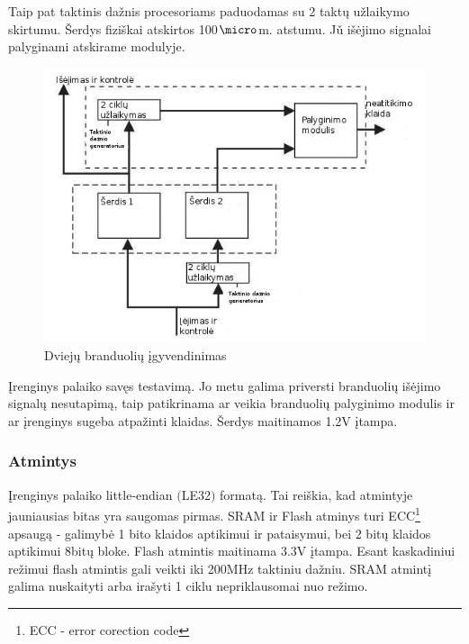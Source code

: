 \documentclass[a4paper, 12pt]{article} %
\begin{document}
\begin{onehalfspacing}
Taip pat taktinis da\v{z}nis procesoriams paduodamas su 2 takt\k{u} u\v{z}laikymo skirtumu. \v{S}erdys fizi\v{s}kai atskirtos 100$\micro$m. atstumu.  
J\v{u} i\v{s}\.ejimo signalai palyginami atskirame modulyje.
\begin{figure}[H] %
\centering %
\includegraphics[scale=2.8]{pav/impl.jpg} %
\captionsetup{labelformat=numbfirst} %
\captionsetup{labelseparator=tarpas}
\caption{Dviej\k{u} branduoli\k{u} \k{i}gyvendinimas}
\label{vienas}
\end{figure}
\k{I}renginys palaiko sav\k{e}s testavim\k{a}. Jo metu galima priversti branduoli\k{u} i\v{s}\.ejimo signal\k{u} nesutapim\k{a}, taip patikrinama ar veikia branduoli\k{u} palyginimo modulis ir ar \k{i}renginys sugeba atpa\v{z}inti klaidas. \v{S}erdys maitinamos 1.2V \k{i}tampa. 


\subsubsection{Atmintys}
\k{I}renginys palaiko little-endian $($LE32$)$ format\k{a}. Tai rei\v{s}kia, kad atmintyje jauniausias bitas yra saugomas pirmas.
SRAM ir Flash atminys turi ECC\footnote{ECC - error corection code} apsaug\k{a} - galimyb\.e 1 bito klaidos aptikimui ir pataisymui, bei 2 bit\k{u} klaidos aptikimui 8bit\k{u} bloke. Flash atmintis maitinama 3.3V \k{i}tampa. Esant kaskadiniui
re\v{z}imui flash atmintis gali veikti iki 200MHz taktiniu da\v{z}niu. SRAM atmint\k{i} galima nuskaityti arba ira\v{s}yti 1 ciklu nepriklausomai nuo re\v{z}imo.   



\end{onehalfspacing}
\end{document}
